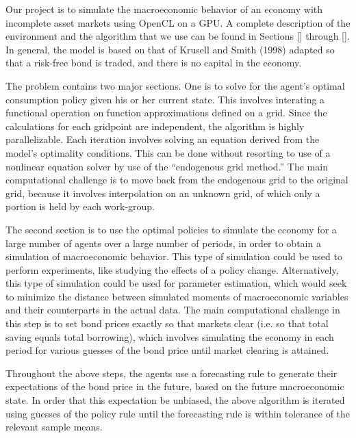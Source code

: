 \documentclass[a4paper,12pt]{article}
\numberwithin{equation}{section}
\theoremstyle{definition}
\begin{document}
\small

\setlength\voffset{-0.75 in}

\changepage{1.5 in}{1 in}{0 in}{-0.5 in}{0 in}{0 in}{0 in}{0 in}{0 in}


Our project is to simulate the macroeconomic behavior of an economy
with incomplete asset markets using OpenCL on a GPU. A complete
description of the environment and the algorithm that we use can be
found in Sections [] through []. In general, the model is based on
that of Krusell and Smith (1998) adapted so that a risk-free bond is
traded, and there is no capital in the economy.

The problem contains two major sections. One is to solve for the
agent's optimal consumption policy given his or her current
state. This involves interating a functional operation on function
approximations defined on a grid. Since the calculations for each
gridpoint are independent, the algorithm is highly
parallelizable. Each iteration involves solving an equation derived
from the model's optimality conditions. This can be done without
resorting to use of a nonlinear equation solver by use of the
``endogenous grid method.'' The main computational challenge is to
move back from the endogenous grid to the original grid, because it
involves interpolation on an unknown grid, of which only a portion is
held by each work-group.

The second section is to use the optimal policies to simulate the
economy for a large number of agents over a large number of periods,
in order to obtain a simulation of macroeconomic behavior. This type
of simulation could be used to perform experiments, like studying the
effects of a policy change. Alternatively, this type of simulation
could be used for parameter estimation, which would seek to minimize
the distance between simulated moments of macroeconomic variables and
their counterparts in the actual data. The main computational
challenge in this step is to set bond prices exactly so that markets
clear (i.e. so that total saving equals total borrowing), which
involves simulating the economy in each period for various guesses of
the bond price until market clearing is attained.

Throughout the above steps, the agents use a forecasting rule to
generate their expectations of the bond price in the future, based on
the future macroeconomic state. In order that this expectation be
unbiased, the above algorithm is iterated using guesses of the policy
rule until the forecasting rule is within tolerance of the relevant
sample means.
\end{document}
